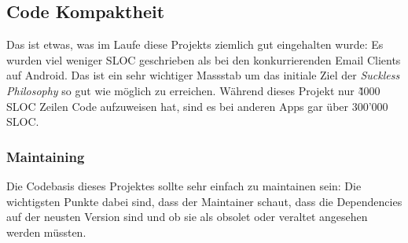 \documentclass[a4paper,11pt]{article}
\begin{document}


\subsection{Code Kompaktheit}
Das ist etwas, was im Laufe diese Projekts ziemlich gut eingehalten wurde: Es wurden viel weniger SLOC geschrieben als bei den konkurrierenden Email Clients auf Android. Das ist ein sehr wichtiger Massstab um das initiale Ziel der \textit{Suckless Philosophy} so gut wie möglich zu erreichen. Während dieses Projekt nur \~ 4000 SLOC Zeilen Code aufzuweisen hat, sind es bei anderen Apps gar über 300'000 SLOC.
\subsubsection{Maintaining}
Die Codebasis dieses Projektes sollte sehr einfach zu maintainen sein: Die wichtigsten Punkte dabei sind, dass der Maintainer schaut, dass die Dependencies auf der neusten Version sind und ob sie als obsolet oder veraltet angesehen werden müssten.\\
\end{document}
